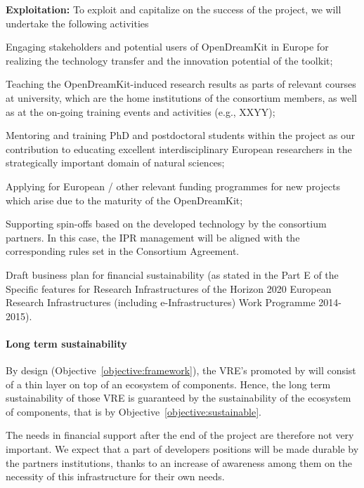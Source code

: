 {\bf Exploitation:} To exploit and capitalize on the success of the project, we will undertake the following activities
\begin{compactenum}
\item Engaging stakeholders and potential users of OpenDreamKit in Europe for realizing the technology transfer and the innovation potential of the toolkit;
\item Teaching the OpenDreamKit-induced research results as parts of relevant courses at university, which are the home institutions of the consortium members, as well as at the on-going training events and activities (e.g., XXYY);
\item Mentoring and training PhD and postdoctoral students within the project as our contribution to educating excellent interdisciplinary European researchers in the strategically important domain of natural sciences;
\item Applying for European / other relevant funding programmes for new projects which arise due to the maturity of the OpenDreamKit;
\item Supporting spin-offs based on the developed technology by the consortium partners. In this case, the IPR management will be aligned with the corresponding rules set in the Consortium Agreement.
\end{compactenum}


Draft business plan for financial sustainability (as stated in the Part
E of the Specific features for Research Infrastructures of the Horizon
2020 European Research Infrastructures (including e-Infrastructures)
Work Programme 2014-2015).

\paragraph{Long term sustainability}

By design (Objective~\ref{objective:framework}), the VRE's promoted by
\TheProject will consist of a thin layer on top of an ecosystem of
components. Hence, the long term sustainability of those VRE is
guaranteed by the sustainability of the ecosystem of components, that
is by Objective~\ref{objective:sustainable}.

The needs in financial support after the end of the project are
therefore not very
important. We expect that a part of developers positions will be made
durable by the partners institutions, thanks to an increase of
awareness among them on the necessity of this infrastructure for their
own needs.

